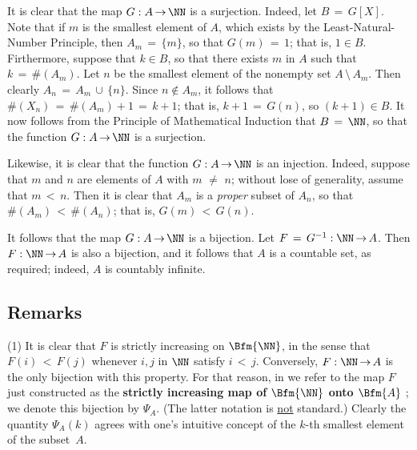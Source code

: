         It is clear that the map $G:A \,{\rightarrow}\, {\NN}$ is a surjection. Indeed, let $B \,=\, G[X]$. Note that if $m$ is the smallest element of $A$, which exists by the Least-Natural-Number Principle,
    then $A_{m} \,=\, \{m\}$, so that $G(m) \,=\, 1$; that is, $1{\in}B$. Firthermore, suppose that $k{\in}B$, so that there exists $m$ in $A$ such that $k \,=\, \#(A_{m})$.
    Let $n$ be the smallest element of the nonempty set $A\,{\setminus}\,A_{m}$. Then clearly $A_{n} \,=\, A_{m}\,{\cup}\,\{n\}$.
    Since $n \not \in A_{m}$, it follows that $\#(X_{n}) \,=\,\#(A_{m}) + 1 \,=\, k+1$; that is, $k+1 \,=\, G(n)$, so $(k+1){\in}B$.
    It now follows from the Principle of Mathematical Induction that $B \,=\, {\NN}$, so that the function $G:A \,{\rightarrow}\, {\NN}$ is a surjection.

        Likewise, it is clear that the function $G:A \,{\rightarrow}\, {\NN}$ is an injection.
    Indeed, suppose that $m$ and $n$ are elements of $A$ with $m \,\,{\neq}\,\, n$; without lose of generality, assume that $m\,<\,n$.
    Then it is clear that $A_{m}$ is a {\em proper} subset of $A_{n}$, so that $\#(A_{m})\,<\,\#(A_{n})$; that is, $G(m)\,<\,G(n)$.

        It follows that the map $G:A \,{\rightarrow}\, {\NN}$ is a bijection. Let $F \,=\, G^{-1}:{\NN} \,{\rightarrow}\, A$.
    Then $F:{\NN} \,{\rightarrow}\, A$ is also a bijection, and it follows that $A$ is a countable set, as required; indeed, $A$ is countably infinite.

\VV

            \subsection{\small{\bf Remarks}}
            \label{RemrkA20.10B}

\V

\hspace*{\parindent}(1) It is clear that $F$ is strictly increasing on $\Bfm{{\NN}}$,
    in the sense that $F(i)\,<\,F(j)$ whenever $i, j$ in ${\NN}$ satisfy $i\,<\,j$.
    Conversely, $F:{\NN} \,{\rightarrow}\, A$ is the only bijection with this property.
    For that reason, in {\ThisText} we refer to the map $F$ just constructed as the {\bf strictly increasing map of $\Bfm{{\NN}}$ onto $\Bfm{A}$}
    ; we denote this bijection by ${\Psi}_{A}$. (The latter notation is \underline{not} standard.)
    Clearly the quantity ${\Psi}_{A}(k)$ agrees with one's intuitive concept of the $k$-th smallest element of the subset~$A$.

